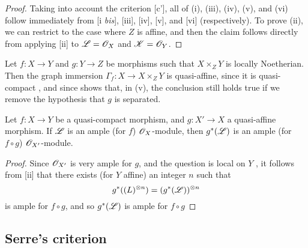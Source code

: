 \begin{proof}
\label{proof-2.5.1.10}
Taking into account the criterion [c'], all of (i), (iii), (iv), (v), and (vi) follow immediately from [i \emph{bis}], [iii], [iv], [v], and [vi] (respectively).
To prove (ii), we can restrict to the case where $Z$ is affine, and then the claim follows directly from applying [ii] to $\mathscr{L}=\mathscr{O}_X$ and $\mathscr{K}=\mathscr{O}_Y$.
\end{proof}

\begin{rmk}[5.1.11]
Let $f:X\to Y$ and $g:Y\to Z$ be morphisms such that $X\times_Z Y$ is locally Noetherian.
Then the graph immersion $\Gamma_f:X\to X\times_Z Y$ is quasi-affine, since it is quasi-compact , and since  shows that, in (v), the conclusion still holds true if we remove the hypothesis that $g$ is separated.
\end{rmk}

\begin{prop}[5.1.12]
\label{2.5.1.12}
Let $f:X\to Y$ be a quasi-compact morphism, and $g:X'\to X$ a quasi-affine morphism.
If $\mathscr{L}$ is an ample (for $f$) $\mathscr{O}_X$-module, then $g^*(\mathscr{L})$ is an ample (for $f\circ g$) $\mathscr{O}_{X'}$-module.
\end{prop}

\begin{proof}
\label{proof-2.5.1.12}
Since $\mathscr{O}_{X'}$ is very ample for $g$, and the question is local on $Y$ , it follows from [ii] that there exists (for $Y$ affine) an integer $n$ such that
\[
    g^*(\mathscr(L)^{\otimes n}) = (g^*(\mathscr{L}))^{\otimes n}
\]
is ample for $f\circ g$, and so $g^*(\mathscr{L})$ is ample for $f\circ g$ 
\end{proof}

\subsection{Serre's criterion}
\label{subsection:serres-criterion}

